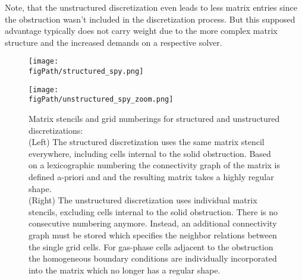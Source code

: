 Note, that the unstructured discretization even leads to less matrix entries since the obstruction wasn't included in the discretization process. But this supposed advantage typically does not carry weight due to the more complex matrix structure and the increased demands on a respective solver.


\begin{figure}[H]
\begin{center}
\begin{minipage}[b]{0.475\textwidth}
\centering
\end{minipage}
\hspace{5mm}
\begin{minipage}[b]{0.475\textwidth}
\centering
\end{minipage}
\end{center}
\caption[Structured versus unstructured discretization]{Matrix stencils and grid numberings for structured and unstructured discretizations:\\
(Left) The structured discretization uses the same matrix stencil everywhere, including cells internal to the solid obstruction. 
Based on a lexicographic numbering the connectivity graph of the matrix is defined a-priori and and the resulting matrix takes a highly regular shape. \\
(Right) The unstructured discretization uses individual matrix stencils, excluding cells internal to the solid obstruction. There is no consecutive numbering anymore. Instead, an additional connectivity graph must be stored which specifies the neighbor relations between the single grid cells. For gas-phase cells adjacent to the obstruction the homogeneous boundary conditions are individually incorporated into the matrix which no longer has a regular shape.}
\label{FIG_SCARC_structured_vs_unstructured_discretization}
\begin{center}
\begin{minipage}[b]{0.475\textwidth}
\texttt{[image: \\figPath/structured\_spy.png]}
\end{minipage}
\hspace{5mm}
\begin{minipage}[b]{0.475\textwidth}
\texttt{[image: \\figPath/unstructured\_spy\_zoom.png]}

\end{minipage}
\end{center}
\end{figure}
